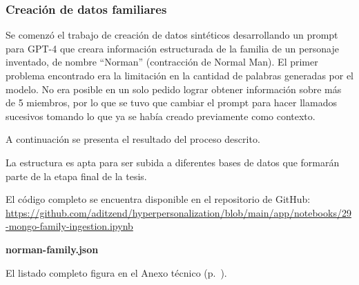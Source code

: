\subsubsection{Creación de datos familiares}

Se comenzó el trabajo de creación de datos sintéticos desarrollando un prompt para GPT-4 que creara información estructurada de la familia de un personaje inventado, de nombre ``Norman'' (contracción de Normal Man). El primer problema encontrado era la limitación en la cantidad de palabras generadas por el modelo. No era posible en un solo pedido lograr obtener información sobre más de 5 miembros, por lo que se tuvo que cambiar el prompt para hacer llamados sucesivos tomando lo que ya se había creado previamente como contexto.

A continuación se presenta el resultado del proceso descrito.

La estructura es apta para ser subida a diferentes bases de datos que formarán parte de la etapa final de la tesis.

El código completo se encuentra disponible en el repositorio de GitHub: \url{https://github.com/aditzend/hyperpersonalization/blob/main/app/notebooks/29-mongo-family-ingestion.ipynb}

\textbf{norman-family.json}

El listado completo figura en el Anexo técnico (p.~\pageref{anexo:code-4-3-1-1}).
